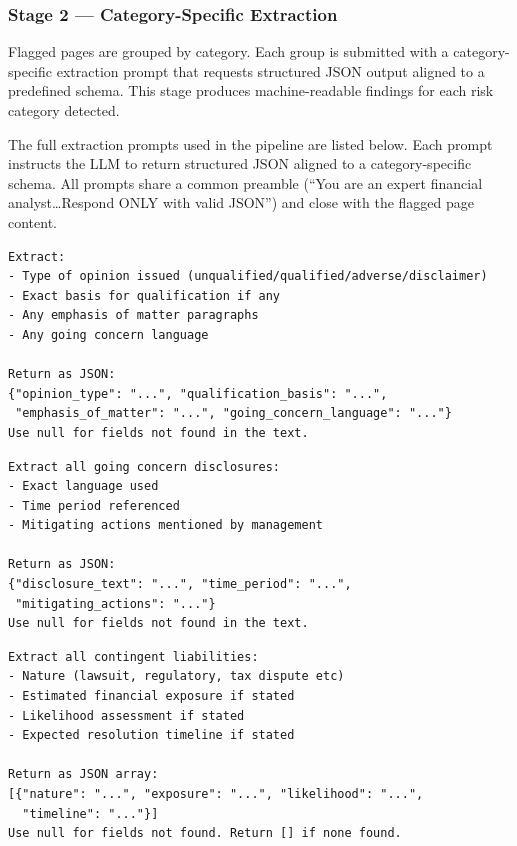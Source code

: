 \documentclass[12pt,a4paper]{article}
\begin{document}
\subsubsection{Stage 2 --- Category-Specific Extraction}

Flagged pages are grouped by category. Each group is submitted with a
category-specific extraction prompt that requests structured JSON output
aligned to a predefined schema. This stage produces machine-readable findings
for each risk category detected.

The full extraction prompts used in the pipeline are listed below.
Each prompt instructs the LLM to return structured JSON aligned to a
category-specific schema. All prompts share a common preamble
(``You are an expert financial analyst\ldots Respond ONLY with valid JSON'')
and close with the flagged page content.

\begin{lstlisting}[language={}, caption={Extraction prompt: Auditor Opinion}]
Extract:
- Type of opinion issued (unqualified/qualified/adverse/disclaimer)
- Exact basis for qualification if any
- Any emphasis of matter paragraphs
- Any going concern language

Return as JSON:
{"opinion_type": "...", "qualification_basis": "...",
 "emphasis_of_matter": "...", "going_concern_language": "..."}
Use null for fields not found in the text.
\end{lstlisting}

\begin{lstlisting}[language={}, caption={Extraction prompt: Going Concern}]
Extract all going concern disclosures:
- Exact language used
- Time period referenced
- Mitigating actions mentioned by management

Return as JSON:
{"disclosure_text": "...", "time_period": "...",
 "mitigating_actions": "..."}
Use null for fields not found in the text.
\end{lstlisting}

\begin{lstlisting}[language={}, caption={Extraction prompt: Contingent Liabilities}]
Extract all contingent liabilities:
- Nature (lawsuit, regulatory, tax dispute etc)
- Estimated financial exposure if stated
- Likelihood assessment if stated
- Expected resolution timeline if stated

Return as JSON array:
[{"nature": "...", "exposure": "...", "likelihood": "...",
  "timeline": "..."}]
Use null for fields not found. Return [] if none found.
\end{lstlisting}
\end{document}
